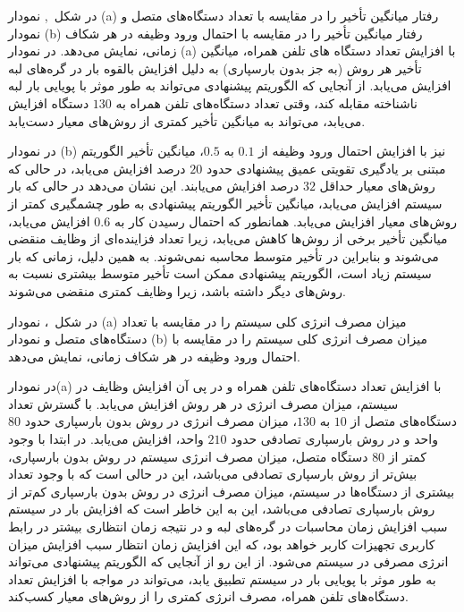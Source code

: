 
در شکل~, نمودار (‌a) رفتار میانگین تأخیر را در مقایسه با تعداد دستگاه‌های متصل و نمودار (b) رفتار میانگین تأخیر را در مقایسه با احتمال ورود وظیفه در هر شکاف زمانی، نمایش می‌دهد. در نمودار (a) با افزایش تعداد دستگاه های تلفن همراه، میانگین تأخیر هر روش (به جز بدون بارسپاری) به دلیل افزایش بالقوه بار در گره‌های لبه افزایش می‌یابد. از آنجایی که الگوریتم پیشنهادی می‌تواند به طور موثر با پویایی بار لبه ناشناخته مقابله کند، وقتی تعداد دستگاه‌های تلفن همراه به $130$ دستگاه افزایش می‌یابد، می‌تواند به میانگین تأخیر کمتری از روش‌های معیار دست‌یابد.


در نمودار (b) نیز با افزایش احتمال ورود وظیفه از $0.1$ به $0.5$، میانگین تأخیر الگوریتم مبتنی بر یادگیری تقویتی عمیق پیشنهادی حدود $20$ درصد افزایش می‌یابد، در حالی که روش‌های معیار حداقل $32$ درصد افزایش می‌یابند. این نشان می‌دهد در حالی که بار سیستم افزایش می‌یابد، میانگین تأخیر الگوریتم پیشنهادی به طور چشمگیری کمتر از روش‌های معیار افزایش می‌یابد. همانطور که احتمال رسیدن کار به $0.6$ افزایش می‌یابد، میانگین تأخیر برخی از روش‌ها کاهش می‌یابد، زیرا تعداد فزاینده‌ای از وظایف منقضی می‌شوند و بنابراین در تأخیر متوسط ​​محاسبه نمی‌شوند. به همین دلیل، زمانی که بار سیستم زیاد است، الگوریتم پیشنهادی ممکن است تأخیر متوسط ​​بیشتری نسبت به روش‌های دیگر داشته باشد، زیرا وظایف کمتری منقضی می‌شوند. 




در شکل~، نمودار (‌a) میزان مصرف انرژی کلی سیستم را در مقایسه با تعداد دستگاه‌های متصل و نمودار (b) میزان مصرف انرژی کلی سیستم را در مقایسه با احتمال ورود وظیفه در هر شکاف زمانی، نمایش می‌دهد. 



در نمودار(a) با افزایش تعداد دستگاه‌های تلفن همراه و در پی آن افزایش وظایف در سیستم، میزان مصرف انرژی در هر روش افزایش می‌یابد. با گسترش تعداد دستگاه‌های متصل از $‌10$  به $130$، میزان مصرف انرژی در روش بدون بارسپاری حدود $80$ واحد و در روش بارسپاری تصادفی حدود $‌210$ واحد، افزایش می‌یابد. در ابتدا با وجود کمتر از $80$ دستگاه متصل، میزان مصرف انرژی سیستم در روش بدون بارسپاری، بیش‌تر از روش بارسپاری تصادفی می‌باشد، این در حالی است که با وجود تعداد بیشتری از دستگاه‌ها در سیستم، میزان مصرف انرژی در روش بدون بارسپاری کم‌تر از روش بارسپاری تصادفی می‌باشد، این به این خاطر است که افزایش بار در سیستم سبب افزایش زمان محاسبات در گره‌های لبه و در نتیجه زمان انتظاری بیشتر در رابط کاربری تجهیزات کاربر خواهد بود، که این افزایش زمان انتظار سبب افزایش میزان انرژی مصرفی در سیستم می‌شود. از این رو از آنجایی که الگوریتم پیشنهادی می‌تواند به طور موثر با پویایی بار در سیستم تطبیق یابد، می‌تواند در مواجه با افزایش تعداد دستگاه‌های تلفن همراه، مصرف انرژی کمتری را از روش‌های معیار کسب‌کند. 


